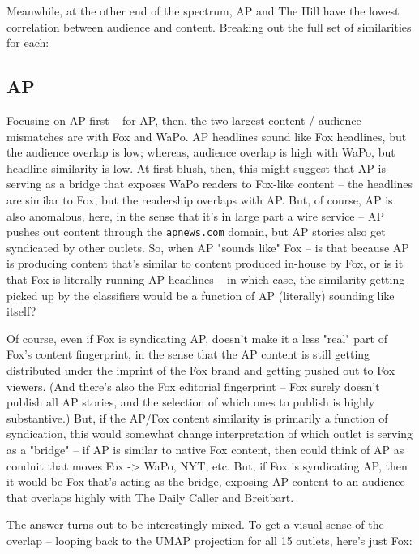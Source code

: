 \documentclass{scrartcl}
\begin{document}
Meanwhile, at the other end of the spectrum, AP and The Hill have the lowest correlation between audience and content. Breaking out the full set of similarities for each:


\subsection{AP}

Focusing on AP first -- for AP, then, the two largest content / audience mismatches are with Fox and WaPo. AP headlines sound like Fox headlines, but the audience overlap is low; whereas, audience overlap is high with WaPo, but headline similarity is low. At first blush, then, this might suggest that AP is serving as a bridge that exposes WaPo readers to Fox-like content -- the headlines are similar to Fox, but the readership overlaps with AP. But, of course, AP is also anomalous, here, in the sense that it's in large part a wire service -- AP pushes out content through the \texttt{apnews.com} domain, but AP stories also get syndicated by other outlets. So, when AP "sounds like" Fox -- is that because AP is producing content that's similar to content produced in-house by Fox, or is it that Fox is literally running AP headlines -- in which case, the similarity getting picked up by the classifiers would be a function of AP (literally) sounding like itself?

Of course, even if Fox is syndicating AP, doesn't make it a less "real" part of Fox's content fingerprint, in the sense that the AP content is still getting distributed under the imprint of the Fox brand and getting pushed out to Fox viewers. (And there's also the Fox editorial fingerprint -- Fox surely doesn't publish all AP stories, and the selection of which ones to publish is highly substantive.) But, if the AP/Fox content similarity is primarily a function of syndication, this would somewhat change interpretation of which outlet is serving as a "bridge" -- if AP is similar to native Fox content, then could think of AP as conduit that moves Fox -> WaPo, NYT, etc. But, if Fox is syndicating AP, then it would be Fox that's acting as the bridge, exposing AP content to an audience that overlaps highly with The Daily Caller and Breitbart.

The answer turns out to be interestingly mixed. To get a visual sense of the overlap -- looping back to the UMAP projection for all 15 outlets, here's just Fox:

\end{document}
